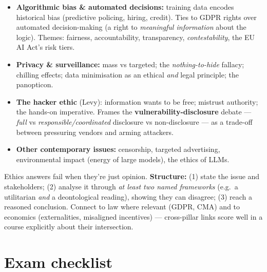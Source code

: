 \documentclass[11pt,a4paper]{article}
\begin{document}
\begin{useful}
\begin{itemize}[leftmargin=*,itemsep=1pt]
  \item \textbf{Algorithmic bias \& automated decisions:} training data encodes historical bias (predictive policing, hiring, credit). Ties to GDPR rights over automated decision-making (a right to \emph{meaningful information} about the logic). Themes: fairness, accountability, transparency, \emph{contestability}, the EU AI Act's risk tiers.
  \item \textbf{Privacy \& surveillance:} mass vs targeted; the \emph{nothing-to-hide} fallacy; chilling effects; data minimisation as an ethical \emph{and} legal principle; the panopticon.
  \item \textbf{The hacker ethic} (Levy): information wants to be free; mistrust authority; the hands-on imperative. Frames the \textbf{vulnerability-disclosure} debate --- \emph{full} vs \emph{responsible/coordinated} disclosure vs non-disclosure --- as a trade-off between pressuring vendors and arming attackers.
  \item \textbf{Other contemporary issues:} censorship, targeted advertising, environmental impact (energy of large models), the ethics of LLMs.
\end{itemize}
\end{useful}

\begin{gotcha}
Ethics answers fail when they're just opinion. \textbf{Structure:} (1) state the issue and stakeholders; (2) analyse it through \emph{at least two named frameworks} (e.g.\ a utilitarian \emph{and} a deontological reading), showing they can disagree; (3) reach a reasoned conclusion. Connect to law where relevant (GDPR, CMA) and to economics (externalities, misaligned incentives) --- cross-pillar links score well in a course explicitly about their intersection.
\end{gotcha}

\section*{Exam checklist}
\end{document}
